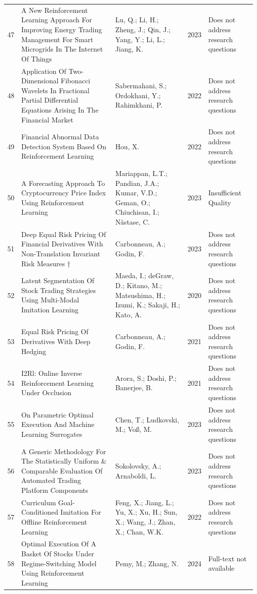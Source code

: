 \begin{small}
\begin{longtable}{r p{5cm} p{4cm} p{1cm} p{5cm}}
47 & A New Reinforcement Learning Approach For Improving Energy Trading Management For Smart Microgrids In The Internet Of Things & Lu, Q.; Li, H.; Zheng, J.; Qin, J.; Yang, Y.; Li, L.; Jiang, K. & 2023 & Does not address research questions \\
48 & Application Of Two-Dimensional Fibonacci Wavelets In Fractional Partial Differential Equations Arising In The Financial Market & Sabermahani, S.; Ordokhani, Y.; Rahimkhani, P. & 2022 & Does not address research questions \\
49 & Financial Abnormal Data Detection System Based On Reinforcement Learning & Hou, X. & 2022 & Does not address research questions \\
50 & A Forecasting Approach To Cryptocurrency Price Index Using Reinforcement Learning & Mariappan, L.T.; Pandian, J.A.; Kumar, V.D.; Geman, O.; Chiuchisan, I.; Năstase, C. & 2023 & Insufficient Quality \\
51 & Deep Equal Risk Pricing Of Financial Derivatives With Non-Translation Invariant Risk Measures † & Carbonneau, A.; Godin, F. & 2023 & Does not address research questions \\
52 & Latent Segmentation Of Stock Trading Strategies Using Multi-Modal Imitation Learning & Maeda, I.; deGraw, D.; Kitano, M.; Matsushima, H.; Izumi, K.; Sakaji, H.; Kato, A. & 2020 & Does not address research questions \\
53 & Equal Risk Pricing Of Derivatives With Deep Hedging & Carbonneau, A.; Godin, F. & 2021 & Does not address research questions \\
54 & I2Rl: Online Inverse Reinforcement Learning Under Occlusion & Arora, S.; Doshi, P.; Banerjee, B. & 2021 & Does not address research questions \\
55 & On Parametric Optimal Execution And Machine Learning Surrogates & Chen, T.; Ludkovski, M.; Voß, M. & 2023 & Does not address research questions \\
56 & A Generic Methodology For The Statistically Uniform \& Comparable Evaluation Of Automated Trading Platform Components & Sokolovsky, A.; Arnaboldi, L. & 2023 & Does not address research questions \\
57 & Curriculum Goal-Conditioned Imitation For Offline Reinforcement Learning & Feng, X.; Jiang, L.; Yu, X.; Xu, H.; Sun, X.; Wang, J.; Zhan, X.; Chan, W.K. & 2022 & Does not address research questions \\
58 & Optimal Execution Of A Basket Of Stocks Under Regime-Switching Model Using Reinforcement Learning & Pemy, M.; Zhang, N. & 2024 & Full-text not available \\

\end{longtable}
\end{small}
